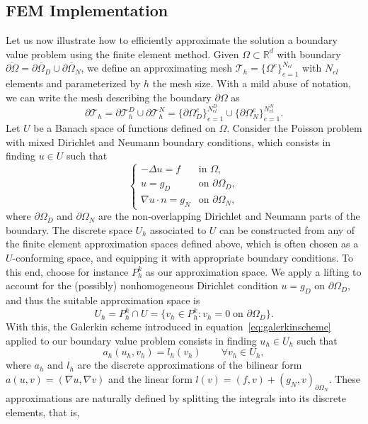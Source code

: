 \documentclass{article}
\newcommand{\R}{\mathbb{R}}
\newcommand{\ton}{\text{on }}
\begin{document}
\subsection{FEM Implementation}
Let us now illustrate how to efficiently approximate the solution a boundary value problem using the finite element method. Given $\Omega\subset \R^d$ with boundary $\overline{\partial \Omega} = \overline{\partial\Omega_D} \cup \overline{\partial\Omega_N}$, we define an approximating mesh  $\mathcal{T}_h = \{\Omega^e\}_{e=1}^{N_{el}}$ with $N_{el}$ elements and parameterized by $h$ the mesh size. With a mild abuse of notation,  we can write the mesh describing the boundary $\partial\Omega$ as 
$$\partial\mathcal{T}_h = \partial\mathcal{T}_h^D \cup\partial\mathcal{T}_h^N = \{\partial\Omega^e_D\}_{e=1}^{N_{el}^D} \cup \{\partial\Omega^e_N\}_{e=1}^{N_{el}^N}.$$
Let $U$ be a Banach space of functions defined on $\Omega$. Consider the Poisson problem with mixed Dirichlet and Neumann boundary conditions, which consists in finding $u\in U$ such that
$$
\begin{cases}
    -\Delta u = f & \text{in } \Omega, \\
    u = g_D & \text{on } \partial\Omega_D, \\
    \nabla u \cdot n = g_N & \text{on } \partial\Omega_N,
\end{cases}
$$
where $\partial\Omega_D$ and $\partial\Omega_N$ are the non-overlapping Dirichlet and Neumann parts of the boundary. The discrete space $U_h$ associated to $U$ can be constructed from any of the finite element approximation spaces defined above, which is often chosen as a $U$-conforming space, and equipping it with appropriate boundary conditions. To this end, choose for instance $P_h^k$ as our approximation space. We apply a lifting to account for the (possibly) nonhomogeneous Dirichlet condition $u=g_D$ on $\partial\Omega_D$, and thus the suitable approximation space is
$$U_h = P_h^k \cap U = \{v_h\in P_h^k: v_h = 0 \;\ton \partial\Omega_D\}.$$
With this, the Galerkin scheme introduced in equation~\ref{eq:galerkinscheme} applied to our boundary value problem consists in finding $u_h \in U_h$ such that 
$$ a_h(u_h, v_h) = l_h(v_h) \qquad \forall v_h \in U_h, $$
where $a_h$ and $l_h$ are the discrete approximations of the bilinear form $a(u,v)=(\nabla u, \nabla v)$ and the linear form $l(v) = (f,v) + (g_N, v)_{\partial\Omega_N}$. These approximations are naturally defined by splitting the integrals into its discrete elements, that is, 
\end{document}

